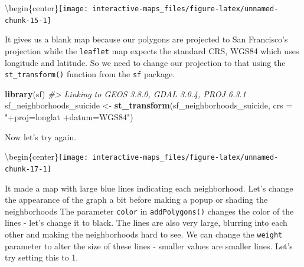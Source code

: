 \documentclass[
  12pt,
]{book}
\newenvironment{Shaded}{\begin{snugshade}}{\end{snugshade}}
\newcommand{\CommentTok}[1]{\textcolor[rgb]{0.56,0.35,0.01}{\textit{#1}}}
\newcommand{\DataTypeTok}[1]{\textcolor[rgb]{0.13,0.29,0.53}{#1}}
\newcommand{\KeywordTok}[1]{\textcolor[rgb]{0.13,0.29,0.53}{\textbf{#1}}}
\newcommand{\NormalTok}[1]{#1}
\newcommand{\OperatorTok}[1]{\textcolor[rgb]{0.81,0.36,0.00}{\textbf{#1}}}
\newcommand{\StringTok}[1]{\textcolor[rgb]{0.31,0.60,0.02}{#1}}
\begin{document}
\textbackslash begin\{center\}\texttt{[image: interactive-maps\_files/figure-latex/unnamed-chunk-15-1]}

It gives us a blank map because our polygons are projected to San Francisco's projection while the \texttt{leaflet} map expects the standard CRS, WGS84 which uses longitude and latitude. So we need to change our projection to that using the \texttt{st\_transform()} function from the \texttt{sf} package.

\begin{Shaded}
\begin{Highlighting}[]
\KeywordTok{library}\NormalTok{(sf)}
\CommentTok{\#> Linking to GEOS 3.8.0, GDAL 3.0.4, PROJ 6.3.1}
\NormalTok{sf\_neighborhoods\_suicide <{-}}\StringTok{ }\KeywordTok{st\_transform}\NormalTok{(sf\_neighborhoods\_suicide,}
                                        \DataTypeTok{crs =} \StringTok{"+proj=longlat +datum=WGS84"}\NormalTok{)}
\end{Highlighting}
\end{Shaded}

Now let's try again.

\begin{Shaded}
\end{Shaded}

\textbackslash begin\{center\}\texttt{[image: interactive-maps\_files/figure-latex/unnamed-chunk-17-1]}

It made a map with large blue lines indicating each neighborhood. Let's change the appearance of the graph a bit before making a popup or shading the neighborhoods The parameter \texttt{color} in \texttt{addPolygons()} changes the color of the lines - let's change it to black. The lines are also very large, blurring into each other and making the neighborhoods hard to see. We can change the \texttt{weight} parameter to alter the size of these lines - smaller values are smaller lines. Let's try setting this to 1.
\end{document}
